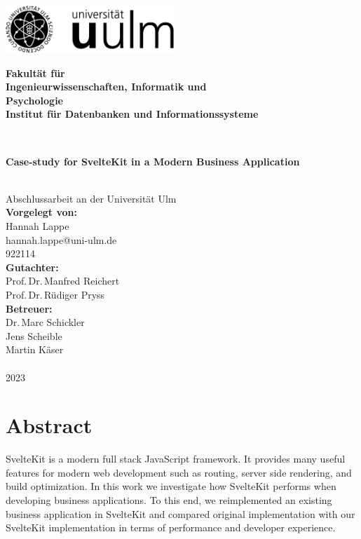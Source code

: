 \documentclass[a4paper,
fontsize=12pt,
headsepline,           %
oneside,               %
number=noenddot,       %
bibliography=totoc,    %
BCOR=15mm              %
]{scrbook}
\makeatletter
\newcommand{\fullname}{Hannah Lappe}
\newcommand{\email}{hannah.lappe@uni-ulm.de}
\newcommand{\titel}{Case-study for SvelteKit in a Modern Business Application}
\newcommand{\jahr}{2023}
\newcommand{\matnr}{922114}
\newcommand{\gutachterA}{Prof.\,Dr.\,Manfred Reichert}
\newcommand{\gutachterB}{Prof.\,Dr.\,Rüdiger Pryss}
\newcommand{\betreuer}{Dr.\,Marc Schickler\\Jens Scheible\\Martin Käser}
\newcommand{\fakultaet}{Ingenieurwissenschaften, Informatik und\\Psychologie}
\newcommand{\institut}{Institut für Datenbanken und Informationssysteme}
\makeatother
\begin{document}
\frontmatter

\thispagestyle{empty}
\begin{addmargin*}[4mm]{-10mm}

  \hfill
  \includegraphics[height=1.8cm]{assets/logo_uulm_sw.png}\\[1em]

  {\footnotesize
  \hspace*{115mm}\parbox[t]{35mm}{\bfseries Fakultät für\\
    \fakultaet\\
    \mdseries \institut}\\[2cm]

  \parbox{140mm}{\bfseries \LARGE \titel}\\[2.5em]
  {\footnotesize Abschlussarbeit an der Universität Ulm}\\[3em]

  {\footnotesize \bfseries Vorgelegt von:}\\
  {\footnotesize \fullname\\ \email}\\ \matnr\\[2em]
  {\footnotesize \bfseries Gutachter:}\\
  {\footnotesize \gutachterA\\ \gutachterB}\\[2em]
  {\footnotesize \bfseries Betreuer:}\\
  {\footnotesize \betreuer}\\\\
  {\footnotesize \jahr}
  }
\end{addmargin*}


\clearpage
\thispagestyle{empty}
\chapter*{Abstract}

SvelteKit is a modern full stack JavaScript framework. It provides many useful features for modern web development such as routing, server side rendering, and build optimization. In this work we investigate how SvelteKit performs when developing business applications. To this end, we reimplemented an existing business application in SvelteKit and compared original implementation with our SvelteKit implementation in terms of performance and developer experience.
\end{document}
